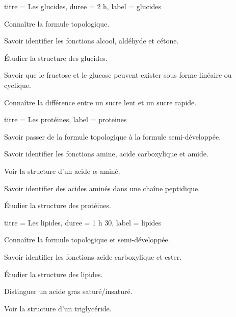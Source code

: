 \begin{multicols}{2}
  \begin{TP}{titre = Les glucides, duree = 2 h, label = glucides}
    \begin{prerequis}
      \item Connaître la formule topologique.
      \item Savoir identifier les fonctions alcool, aldéhyde et cétone.
    \end{prerequis}
    \begin{objectifs}  
      \item Étudier la structure des glucides.
      \item Savoir que le fructose et le glucose peuvent exister sous forme linéaire ou cyclique.
      \item Connaître la différence entre un sucre lent et un sucre rapide.
    \end{objectifs}
  \end{TP}
  \smallskip

  \setcounter{activiteNum}{1}
  \begin{activite}{titre = Les protéines, label = proteines}
    \begin{prerequis}
      \item Savoir passer de la formule topologique à la formule semi-développée.
      \item Savoir identifier les fonctions amine, acide carboxylique et amide.
    \end{prerequis}
    \begin{objectifs}
      \item Voir la structure d'un acide $\alpha$-aminé.
      \item Savoir identifier des acides aminés dans une chaîne peptidique.
      \item Étudier la structure des protéines.
    \end{objectifs}
  \end{activite}

  \setcounter{activiteNum}{0}
  \begin{activite}{titre = Les lipides, duree =  1 h 30, label = lipides}
    \begin{prerequis}
      \item Connaître la formule topologique et semi-développée.
      \item Savoir identifier les fonctions acide carboxylique et ester.
    \end{prerequis}
    \begin{objectifs}
      \item Étudier la structure des lipides.
      \item Distinguer un acide gras saturé/insaturé.
      \item Voir la structure d'un triglycéride.
    \end{objectifs}
  \end{activite}
  \smallskip


\end{multicols}
